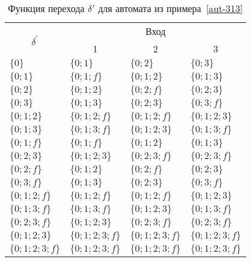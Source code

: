 \begin{table}[H]
\centering
\begin{tabular}{llll}
\toprule
\multicolumn{1}{c}{\multirow{2}{*}{\Large $\delta^\prime$}}
	& \multicolumn{3}{c}{Вход} \\
\cmidrule(rl){2-4}
	& \multicolumn{1}{c}{1}
    & \multicolumn{1}{c}{2}
    & \multicolumn{1}{c}{3} \\
\midrule
$\{0\}$         & $\{0;1\}$       & $\{0;2\}$       & $\{0;3\}$       \\
$\{0;1\}$       & $\{0;1;f\}$     & $\{0;1;2\}$     & $\{0;1;3\}$     \\
$\{0;2\}$       & $\{0;1;2\}$     & $\{0;2;f\}$     & $\{0;2;3\}$     \\
$\{0;3\}$       & $\{0;1;3\}$     & $\{0;2;3\}$     & $\{0;3;f\}$     \\
$\{0;1;2\}$     & $\{0;1;2;f\}$   & $\{0;1;2;f\}$   & $\{0;1;2;3\}$   \\
$\{0;1;3\}$     & $\{0;1;3;f\}$   & $\{0;1;2;3\}$   & $\{0;1;3;f\}$   \\
$\{0;1;f\}$     & $\{0;1;f\}$     & $\{0;1;2\}$     & $\{0;1;3\}$     \\
$\{0;2;3\}$     & $\{0;1;2;3\}$   & $\{0;2;3;f\}$   & $\{0;2;3;f\}$   \\
$\{0;2;f\}$     & $\{0;1;2\}$     & $\{0;2;f\}$     & $\{0;2;3\}$     \\
$\{0;3;f\}$     & $\{0;1;3\}$     & $\{0;2;3\}$     & $\{0;3;f\}$     \\
$\{0;1;2;f\}$   & $\{0;1;2;f\}$   & $\{0;1;2;f\}$   & $\{0;1;2;3\}$   \\
$\{0;1;3;f\}$   & $\{0;1;3;f\}$   & $\{0;1;2;3\}$   & $\{0;1;3;f\}$   \\
$\{0;2;3;f\}$   & $\{0;1;2;3\}$   & $\{0;2;3;f\}$   & $\{0;2;3;f\}$   \\
$\{0;1;2;3\}$   & $\{0;1;2;3;f\}$ & $\{0;1;2;3;f\}$ & $\{0;1;2;3;f\}$ \\
$\{0;1;2;3;f\}$ & $\{0;1;2;3;f\}$ & $\{0;1;2;3;f\}$ & $\{0;1;2;3;f\}$ \\ \bottomrule
\end{tabular}
\caption{Функция перехода $\delta'$ для автомата из примера~\ref{aut-313}}\label{tab3}
\end{table}

